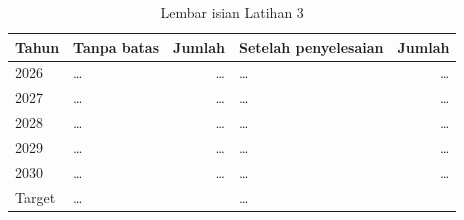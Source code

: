 \begin{table}[!htb]
  \centering
  \caption{Lembar isian Latihan 3}
  \label{tab:ch12-lat3-hasil}
  \begin{tabularx}{\textwidth}{l>{\raggedright\arraybackslash}Xr
                               >{\raggedright\arraybackslash}Xr}
    \hline
    \textbf{Tahun} & \textbf{Tanpa batas} & \textbf{Jumlah} &
      \textbf{Setelah penyelesaian} & \textbf{Jumlah} \\
    \hline
    2026 & \dots & \dots & \dots & \dots \\
    \hline
    2027 & \dots & \dots & \dots & \dots \\
    \hline
    2028 & \dots & \dots & \dots & \dots \\
    \hline
    2029 & \dots & \dots & \dots & \dots \\
    \hline
    2030 & \dots & \dots & \dots & \dots \\
    \hline
    Target & \dots & & \dots & \\
    \hline
  \end{tabularx}
\end{table}
